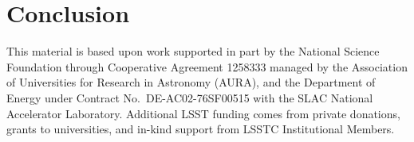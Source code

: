 \documentclass[]{spie}  %
\begin{document}
\section{Conclusion}

\acknowledgments %

This material is based upon work supported in part by the National Science Foundation through Cooperative Agreement 1258333 managed by the Association of Universities for Research in Astronomy (AURA), and the Department of Energy under Contract No.\ DE-AC02-76SF00515 with the SLAC National Accelerator Laboratory.
Additional LSST funding comes from private donations, grants to universities, and in-kind support from LSSTC Institutional Members.

\end{document}

